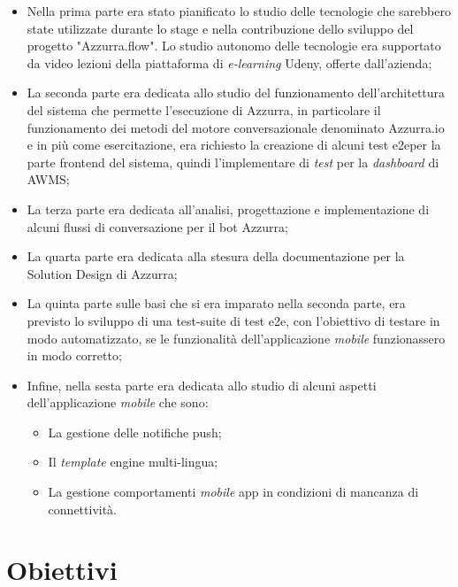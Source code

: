 \begin{itemize}
	\item Nella prima parte era stato pianificato lo studio delle tecnologie che sarebbero state utilizzate durante lo stage e nella contribuzione dello sviluppo del progetto "Azzurra.flow". Lo studio autonomo delle tecnologie era supportato da video lezioni della piattaforma di \emph{e-learning} Udeny, offerte dall'azienda;
	\item La seconda parte era dedicata allo studio del funzionamento dell'\gls{architettura}\ap{[g]} del sistema che permette l'esecuzione di Azzurra, in particolare il funzionamento dei metodi del motore conversazionale denominato Azzurra.io e in più come esercitazione, era richiesto la creazione di alcuni \gls{test e2e}\glsfirstoccur per la parte frontend del sistema, quindi l'implementare di \emph{test} per la \emph{dashboard} di \gls{AWMS};
	\item La terza parte era dedicata all'analisi, progettazione e implementazione di alcuni flussi di conversazione per il \gls{bot}\ap{[g]} Azzurra;
	\item La quarta parte era dedicata alla stesura della documentazione per la Solution Design di Azzurra;
	\item La quinta parte sulle basi che si era imparato nella seconda parte, era previsto lo sviluppo di una test-suite di \gls{test e2e}\ap{[g]}, con l'obiettivo di testare in modo automatizzato, se le funzionalità dell'applicazione \emph{mobile} funzionassero in modo corretto;
	\item Infine, nella sesta parte era dedicata allo studio di alcuni aspetti dell'applicazione \emph{mobile} che sono:
		\begin{itemize}
			\item La gestione delle notifiche push;
			\item Il \emph{template} engine multi-lingua;
			\item La gestione comportamenti \emph{mobile} app in condizioni di mancanza di connettività.
		\end{itemize}
\end{itemize}



\section{Obiettivi}

